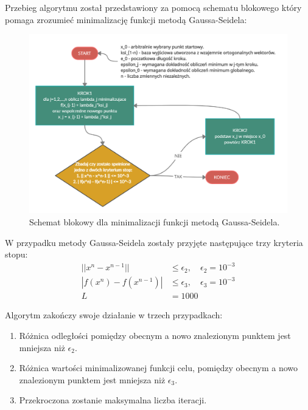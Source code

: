 \documentclass[a4paper,12pt]{article}
\begin{document}
\newpage
Przebieg algorytmu został przedstawiony za pomocą schematu blokowego który pomaga zrozumieć minimalizację funkcji metodą Gaussa-Seidela:
\begin{figure}[H]
    \centering
    \includegraphics[width=\textwidth]{images/uml_gauss_seidel.png}
    \caption{Schemat blokowy dla minimalizacji funkcji metodą Gaussa-Seidela.}
    \label{uml_gauss_seidel}
\end{figure}

W przypadku metody Gaussa-Seidela zostały przyjęte następujące trzy kryteria stopu:
\begin{equation} \label{eq:6}
    \begin{split}
        || x^{n} - x^{n-1} || &\leq \epsilon_{2}, \quad \epsilon_{2} = 10^{-3} \\
        | f(x^{n}) - f(x^{n-1}) | &\leq \epsilon_{3}, \quad \epsilon_{3} = 10^{-3} \\
        L &= 1000
    \end{split}
\end{equation}

Algorytm zakończy swoje działanie w trzech przypadkach:
\begin{enumerate}
    \item Różnica odległości pomiędzy obecnym a nowo znalezionym punktem jest mniejsza niż $\epsilon_{2}$.
    \item Różnica wartości minimalizowanej funkcji celu, pomiędzy obecnym a nowo znalezionym punktem jest mniejsza niż $\epsilon_{3}$.
    \item Przekroczona zostanie maksymalna liczba iteracji.
\end{enumerate}
\end{document}
